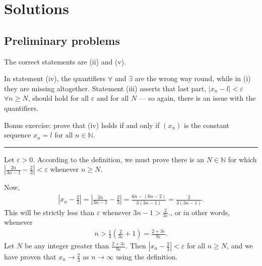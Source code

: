 \documentclass[letterpaper,10pt,english]{jupyterBook}
\begin{document}
\sphinxstepscope


\section{Solutions}
\label{\detokenize{Solutions-full:solutions}}\label{\detokenize{Solutions-full:sol}}\label{\detokenize{Solutions-full::doc}}

\subsection{Preliminary problems}
\label{\detokenize{Solutions-full:preliminary-problems}}\label{\detokenize{Solutions-full:ch1sol}}
\sphinxAtStartPar
{\hyperref[\detokenize{Problems:p1}]{}}
The correct statements are (ii) and (v).

\sphinxAtStartPar
In statement (iv), the quantifiers \(\forall\) and \(\exists\) are the wrong way round, while in (i) they are missing altogether. Statement (iii) asserts that last part, \(|x_n-l|<\varepsilon\) \(\forall n\geq N\), should hold for all \(\varepsilon\) and for all \(N\) — so again, there is an issue with the quantifiers.

\sphinxAtStartPar
Bonus exercise: prove that (iv) holds if and only if \((x_n)\) is the constant sequence \(x_n=l\) for all \(n\in\mathbb{N}\).


\bigskip\hrule\bigskip


\sphinxAtStartPar
{\hyperref[\detokenize{Problems:p2}]{}} 

\sphinxAtStartPar
Let \(\varepsilon>0\). According to the definition, we must prove there is an \(N\in\mathbb{N}\) for which \(\left|\frac{2n}{3n-1}-\frac{2}{3}\right|<\varepsilon\) whenever \(n\geq N\).

\sphinxAtStartPar
Now,
\begin{equation*}
\begin{split}
\left|x_n-\frac{2}{3}\right| = \left|\frac{2n}{3n-1}-\frac{2}{3}\right| = \frac{6n-(6n-2)}{3(3n-1)} = \frac{2}{3(3n-1)}.
\end{split}
\end{equation*}
\sphinxAtStartPar
This will be strictly less than \(\varepsilon\) whenever \(3n-1>\frac{2}{3\varepsilon}\)., or in other words, whenever
\begin{equation*}
\begin{split}
n>\frac{1}{3}\left(\frac{2}{3\varepsilon}+1\right)=\frac{2+3\varepsilon}{9\varepsilon}.
\end{split}
\end{equation*}
\sphinxAtStartPar
Let \(N\) be any integer greater than \(\frac{2+3\varepsilon}{9\varepsilon}\). Then \(\left|x_n-\frac{2}{3}\right|<\varepsilon\) for all \(n\geq N\), and we have proven that \(x_n\rightarrow\frac{2}{3}\) as \(n\rightarrow\infty\) using the definition.
\end{document}
